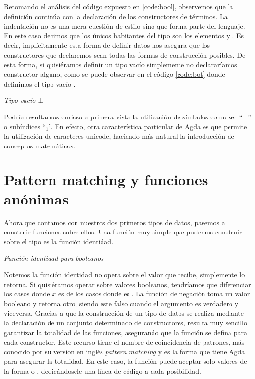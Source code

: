 Retomando el análisis del código expuesto en \ref{code:bool}, observemos que la definición continúa con la declaración de los constructores de términos. La indentación no es una mera cuestión de estilo sino que forma parte del lenguaje. En este caso decimos que los únicos habitantes del tipo  son los elementos  y . Es decir, implícitamente esta forma de definir datos nos asegura que los constructores que declaremos sean todas las formas de construcción posibles.
De esta forma, si quisiéramos definir un tipo vacío simplemente no declararíamos constructor alguno, como se puede observar en el código \ref{code:bot} donde definimos el tipo vacío \AgdaDatatype{$\bot$}.

\begin{agdacode}{\it Tipo vacío $\bot$}\label{code:bot}
  
\end{agdacode}

Podría resultarnos curioso a primera vista la utilización de símbolos como ser ``$\bot$'' o subíndices ``$_{1}$''. En efecto, otra característica particular de Agda es que permite la utilización de caracteres unicode, haciendo más natural la introducción de conceptos matemáticos.

\section{Pattern matching y funciones anónimas} \label{agda:function}

Ahora que contamos con nuestros dos primeros tipos de datos, pasemos a construir funciones sobre ellos.
Una función muy simple que podemos construir sobre el tipo  es la función identidad.

\begin{agdacode}{\it Función identidad para booleanos}\label{code:idBool}

\end{agdacode}
Notemos la función identidad no opera sobre el valor que recibe, simplemente lo retorna. Si quisiéramos operar sobre valores booleanos, tendríamos que diferenciar los casos donde $x$ es  de los casos donde es .
La función  de negación toma un valor booleano y retorna otro, siendo este falso cuando el argumento es verdadero y viceversa.
Gracias a que la construcción de un tipo de datos se realiza mediante la declaración de un conjunto determinado de constructores,
resulta muy sencillo garantizar la totalidad de las funciones, asegurando que la función se defina para cada constructor. Este recurso tiene el nombre de coincidencia de patrones, más conocido por su versión en inglés {\it pattern matching} y es la forma que tiene Agda para asegurar la totalidad. En este caso, la función  puede aceptar solo valores de la forma  o , dedicándosele una línea de código a cada posibilidad. 

